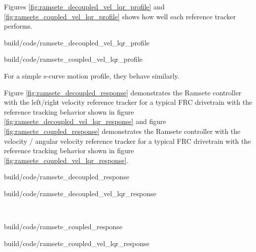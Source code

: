 Figures \ref{fig:ramsete_decoupled_vel_lqr_profile} and
\ref{fig:ramsete_coupled_vel_lqr_profile} shows how well each \gls{reference}
tracker performs.

\begin{bookfigure}
  \begin{minisvg}{2}{build/code/ramsete_decoupled_vel_lqr_profile}
    \caption{Left/right velocity reference tracker response to a motion profile}
    \label{fig:ramsete_decoupled_vel_lqr_profile}
  \end{minisvg}
  \hfill
  \begin{minisvg}{2}{build/code/ramsete_coupled_vel_lqr_profile}
    \caption{Linear/angular velocity reference tracker response to a motion
      profile}
    \label{fig:ramsete_coupled_vel_lqr_profile}
  \end{minisvg}
\end{bookfigure}

For a simple s-curve motion profile, they behave similarly.

Figure \ref{fig:ramsete_decoupled_response} demonstrates the Ramsete controller
with the left/right velocity \gls{reference} tracker for a typical FRC
drivetrain with the \gls{reference} tracking behavior shown in figure
\ref{fig:ramsete_decoupled_vel_lqr_response} and figure
\ref{fig:ramsete_coupled_response} demonstrates the Ramsete controller with the
velocity / angular velocity \gls{reference} tracker for a typical FRC drivetrain
with the \gls{reference} tracking behavior shown in figure
\ref{fig:ramsete_coupled_vel_lqr_response}.

\begin{bookfigure}
  \begin{minisvg}{2}{build/code/ramsete_decoupled_response}
    \caption{Ramsete controller response with left/right velocity reference
      tracker ($b = 2$, $\zeta = 0.7$)}
    \label{fig:ramsete_decoupled_response}
  \end{minisvg}
  \hfill
  \begin{minisvg}{2}{build/code/ramsete_decoupled_vel_lqr_response}
    \caption{Ramsete controller's left/right velocity reference tracker
      response}
    \label{fig:ramsete_decoupled_vel_lqr_response}
  \end{minisvg} \\
  \begin{minisvg}{2}{build/code/ramsete_coupled_response}
    \caption{Ramsete controller response with velocity / angular velocity
      reference tracker ($b = 2$, $\zeta = 0.7$)}
    \label{fig:ramsete_coupled_response}
  \end{minisvg}
  \hfill
  \begin{minisvg}{2}{build/code/ramsete_coupled_vel_lqr_response}
    \caption{Ramsete controller's velocity / angular velocity reference tracker
      response}
    \label{fig:ramsete_coupled_vel_lqr_response}
  \end{minisvg}
\end{bookfigure}


